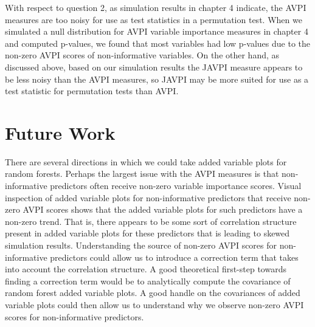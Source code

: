 \documentclass[12pt,twoside]{reedthesis}
\theoremstyle{definition}
\theoremstyle{definition}
\theoremstyle{definition}
\theoremstyle{remark}
\begin{document}
With respect to question 2, as simulation results in chapter 4 indicate,
the AVPI measures are too noisy for use as test statistics in a
permutation test. When we simulated a null distribution for AVPI
variable importance measures in chapter 4 and computed p-values, we
found that most variables had low p-values due to the non-zero AVPI
scores of non-informative variables. On the other hand, as discussed
above, based on our simulation results the JAVPI measure appears to be
less noisy than the AVPI measures, so JAVPI may be more suited for use
as a test statistic for permutation tests than AVPI. \par 

\section{Future Work}\label{future-work}

There are several directions in which we could take added variable plots
for random forests. Perhaps the largest issue with the AVPI measures is
that non-informative predictors often receive non-zero variable
importance scores. Visual inspection of added variable plots for
non-informative predictors that receive non-zero AVPI scores shows that
the added variable plots for such predictors have a non-zero trend. That
is, there appears to be some sort of correlation structure present in
added variable plots for these predictors that is leading to skewed
simulation results. Understanding the source of non-zero AVPI scores for
non-informative predictors could allow us to introduce a correction term
that takes into account the correlation structure. A good theoretical
first-step towards finding a correction term would be to analytically
compute the covariance of random forest added variable plots. A good
handle on the covariances of added variable plots could then allow us to
understand why we observe non-zero AVPI scores for non-informative
predictors. \par

\appendix
\end{document}
